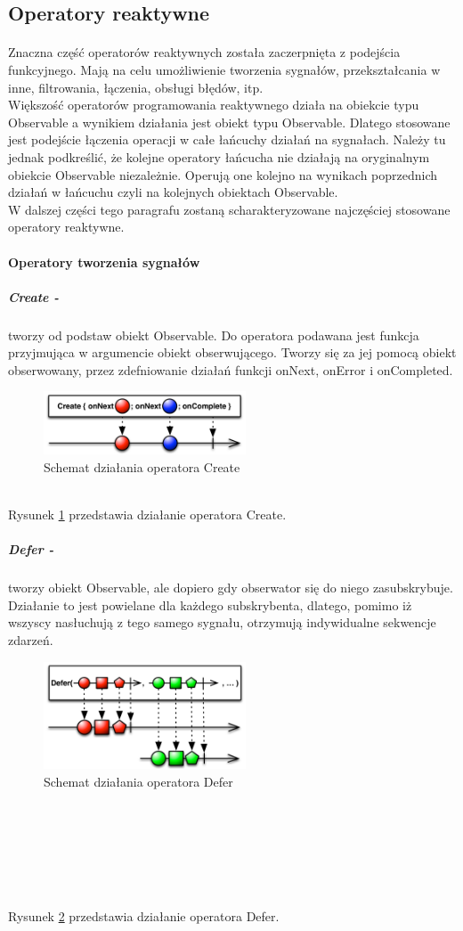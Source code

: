 \documentclass[12pt,oneside,a4paper]{report}
\begin{document}
\subsection{Operatory reaktywne}
\paragraph{}Znaczna część operatorów reaktywnych została zaczerpnięta z podejścia funkcyjnego. Mają na celu umożliwienie tworzenia sygnałów, przekształcania w inne, filtrowania, łączenia, obsługi błędów, itp.\\
Większość operatorów programowania reaktywnego działa na obiekcie typu Observable a wynikiem działania jest obiekt typu Observable. Dlatego stosowane jest podejście łączenia operacji w całe łańcuchy działań na sygnałach. Należy tu jednak podkreślić, że kolejne operatory łańcucha nie działają na oryginalnym obiekcie Observable niezależnie. Operują one kolejno na wynikach poprzednich działań w łańcuchu czyli na kolejnych obiektach Observable. \\
W dalszej części tego paragrafu zostaną scharakteryzowane najczęściej stosowane operatory reaktywne.
\paragraph{Operatory tworzenia sygnałów}
\subparagraph{Create -}tworzy od podstaw obiekt Observable. Do operatora podawana jest funkcja przyjmująca w argumencie obiekt obserwującego. Tworzy się za jej pomocą obiekt obserwowany, przez zdefniowanie działań funkcji onNext, onError i onCompleted. 
\begin{figure}[ht!]
	\centering
	\includegraphics[width=6cm]{create}
	\caption{Schemat działania operatora Create\cite{operators}}
	\label{create}
\end{figure}\\
Rysunek \ref{create} przedstawia działanie operatora Create.
\subparagraph{Defer -}tworzy obiekt Observable, ale dopiero gdy obserwator się do niego zasubskrybuje. Działanie to jest powielane dla każdego subskrybenta, dlatego, pomimo iż wszyscy nasłuchują z tego samego sygnału, otrzymują indywidualne sekwencje zdarzeń. 
\begin{figure}[ht!]
	\centering
	\includegraphics[width=6cm]{defer}
	\caption{Schemat działania operatora Defer\cite{operators}}
	\label{defer}
\end{figure}\\\\\\\\\\\\
Rysunek \ref{defer} przedstawia działanie operatora Defer.
\end{document}
